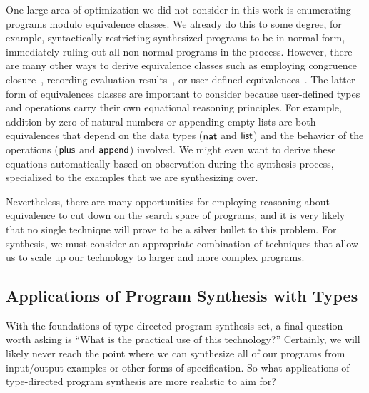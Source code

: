 One large area of optimization we did not consider in this work is enumerating programs modulo equivalence classes.
We already do this to some degree, for example, syntactically restricting synthesized programs to be in normal form, immediately ruling out all non-normal programs in the process.
However, there are many other ways to derive equivalence classes such as employing congruence closure~\citep{nelson-jacm-1980}, recording evaluation results~\citep{albarghouthi-cav-2013}, or user-defined equivalences~\citep{feser-pldi-2015}.
The latter form of equivalences classes are important to consider because user-defined types and operations carry their own equational reasoning principles.
For example, addition-by-zero of natural numbers or appending empty lists are both equivalences that depend on the data types ($\mathsf{nat}$ and $\mathsf{list}$) and the behavior of the operations ($\mathsf{plus}$ and $\mathsf{append}$) involved.
We might even want to derive these equations automatically based on observation during the synthesis process, specialized to the examples that we are synthesizing over.

Nevertheless, there are many opportunities for employing reasoning about equivalence to cut down on the search space of programs, and it is very likely that no single technique will prove to be a silver bullet to this problem.
For synthesis, we must consider an appropriate combination of techniques that allow us to scale up our technology to larger and more complex programs.

\subsection{Applications of Program Synthesis with Types}
\label{subsec:applications-of-program-synthesis-with-types}

With the foundations of type-directed program synthesis set, a final question worth asking is ``What is the practical use of this technology?''
Certainly, we will likely never reach the point where we can synthesize all of our programs from input/output examples or other forms of specification.
So what applications of type-directed program synthesis are more realistic to aim for?

